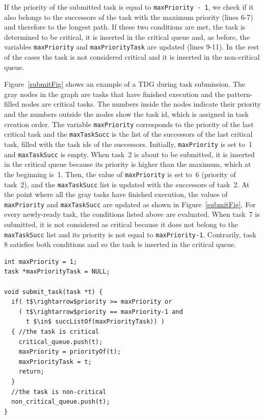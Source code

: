 If the priority of the submitted task is equal to \texttt{maxPriority - 1}, we check if it also belongs to the successors of the task with the maximum priority (lines 6-7) and therefore to the longest path. If these two conditions are met, the task is determined to be critical, it is inserted in the critical queue and, as before, the variables \texttt{maxPriority} and \texttt{maxPriorityTask} are updated (lines 9-11). In the rest of the cases the task is not considered critical and it is inserted in the non-critical queue.

Figure~\ref{submitFig} shows an example of a TDG during task submission. The gray nodes in the graph are tasks that have finished execution and the pattern-filled nodes are critical tasks. The numbers inside the nodes indicate their priority and the numbers outside the nodes show the task id, which is assigned in task creation order. The variable \texttt{maxPriority} corresponds to the priority of the last critical task and the \texttt{maxTaskSucc} is the list of the successors of the last critical task, filled with the task ids of the successors. Initially, \texttt{maxPriority} is set to~1 and \texttt{maxTaskSucc} is empty. When task~2 is about to be submitted, it is inserted in the critical queue because its priority is higher than the maximum, which at the beginning is~1. Then, the value of \texttt{maxPriority} is set to~6 (priority of task~2), and the \texttt{maxTaskSucc} list is updated with the successors of task~2. At the point where all the gray tasks have finished execution, the values of \texttt{maxPriority} and \texttt{maxTaskSucc} are updated as shown  in Figure~\ref{submitFig}. For every newly-ready task, the conditions listed above are evaluated. When task~7 is submitted, it is not considered as critical because it does not belong to the \texttt{maxTaskSucc} list and its priority is not equal to \texttt{maxPriority-1}. Contrarily, task 8 satisfies both conditions and so the task is inserted in the critical queue.

\begin{lstlisting}[float, emph={non_critical_queue, critical_queue,submit_task}, caption={Pseudo-code for task submission with CATS.},label=submission]
int maxPriority = 1;
task *maxPriorityTask = NULL;

void submit_task(task *t) {
  if( t$\rightarrow$priority >= maxPriority or
    ( t$\rightarrow$priority == maxPriority-1 and
      t $\in$ succListOf(maxPriorityTask)) )
  { //the task is critical
    critical_queue.push(t);
    maxPriority = priorityOf(t);
    maxPriorityTask = t;
    return;
  }
  //the task is non-critical
  non_critical_queue.push(t);     
}
\end{lstlisting}

